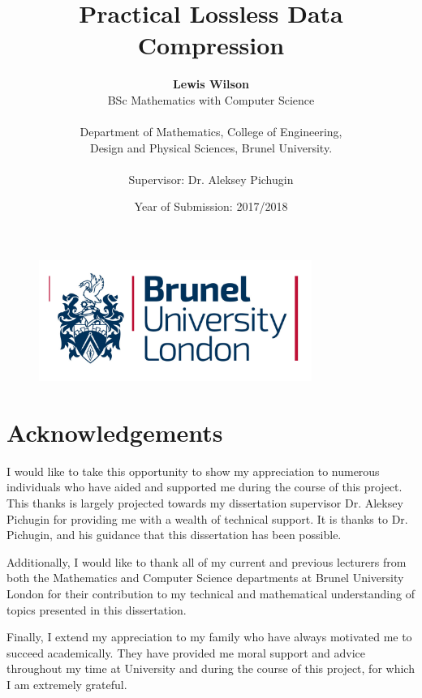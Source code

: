 \documentclass[12pt]{article}
\title{Practical Lossless Data Compression}
\author{\textbf{Lewis Wilson} \\
	BSc Mathematics with Computer Science\\\\
	Department of Mathematics, College of Engineering,\\ 
	Design and Physical Sciences, Brunel University.\\\\
	Supervisor: Dr. Aleksey Pichugin}
\date{Year of Submission: 2017/2018}
\begin{document}
	
\begin{titlepage}
\maketitle
\thispagestyle{empty} %
\begin{figure}[b!]
	\centering
	\includegraphics[width=3.5in]{brunel_logo}
\end{figure}
\end{titlepage}

\setcounter{tocdepth}{2}
\tableofcontents

\clearpage
\listoffigures

\clearpage
\listoftables
\newpage

\section*{Acknowledgements}

I would like to take this opportunity to show my appreciation to numerous individuals who have aided and supported me during the course of this project. This thanks is largely projected towards my dissertation supervisor Dr. Aleksey Pichugin for providing me with a wealth of technical support. It is thanks to Dr. Pichugin, and his guidance that this dissertation has been possible.

Additionally, I would like to thank all of my current and previous lecturers from both the Mathematics and Computer Science departments at Brunel University London for their contribution to my technical and mathematical understanding of topics presented in this dissertation.

Finally, I extend my appreciation to my family who have always motivated me to succeed academically. They have provided me moral support and advice throughout my time at University and during the course of this project, for which I am extremely grateful.

\clearpage
\end{document}
